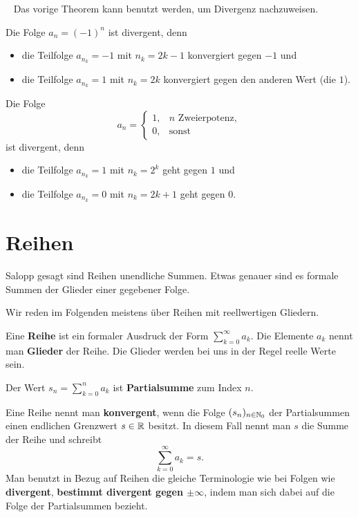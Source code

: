 \begin{bsp} {\ } Das vorige Theorem kann benutzt werden, um Divergenz nachzuweisen. 
	\begin{enuma} 
		\item Die Folge $a_n = (-1)^n$ ist divergent, denn 
		\begin{itemize} 
			\item[] die Teilfolge  $a_{n_k} = -1$ mit $n_k = 2k-1$ konvergiert gegen $-1$ und 
			\item[] die Teilfolge $a_{n_k} = 1$ mit $n_k = 2k$ konvergiert gegen den anderen Wert (die $1$). 
		\end{itemize} 
		\item Die Folge 
		\[
			a_n = \begin{cases} 
				1, & \text{$n$ Zweierpotenz},
				\\ 0, & \text{sonst}
			\end{cases} 
		\]
		ist divergent, denn 
		\begin{itemize} 
			\item[] die Teilfolge $a_{n_k} = 1$ mit $n_k = 2^k$ geht gegen $1$ und 
			\item[] die Teilfolge $a_{n_k} = 0$ mit $n_k = 2 k +1$ geht gegen $0$. 
		\end{itemize} 
	\end{enuma} 
\end{bsp} 

\section{Reihen} 

\begin{bem} 
	Salopp gesagt sind Reihen unendliche Summen. Etwas genauer sind es formale Summen der Glieder einer gegebener Folge. 
	
	Wir reden im Folgenden meistens über Reihen mit reellwertigen Gliedern. 
\end{bem} 

\begin{defn}[Reihe] Eine \textbf{Reihe} ist ein formaler Ausdruck der Form $\sum_{k=0}^\infty a_k$. 
	Die Elemente $a_k$ nennt man \textbf{Glieder} der Reihe. Die Glieder werden bei uns in der Regel reelle Werte sein. 
	
	Der Wert $s_n = \sum_{k=0}^n a_k$ ist \textbf{Partialsumme} zum Index $n$. 
	
	Eine Reihe nennt man \textbf{konvergent}, wenn die Folge $(s_n)_{n \in \mathbb{N}_0}$ der Partialsummen einen endlichen Grenzwert $s \in \mathbb{R}$ besitzt. In diesem Fall nennt man $s$ die Summe der Reihe und schreibt 
	\[
		\sum_{k=0}^\infty a_k = s. 
	\]
	Man benutzt in Bezug auf Reihen die gleiche Terminologie wie bei Folgen wie \textbf{divergent}, \textbf{bestimmt divergent gegen $\pm \infty$}, indem man sich dabei auf die Folge der Partialsummen bezieht. 
\end{defn} 

